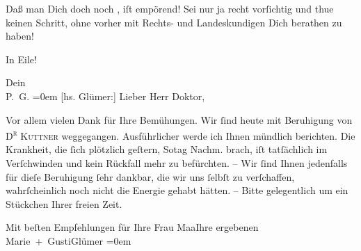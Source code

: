 \pstart
           Daß man Dich doch noch \label{K_L03056-4v}\label{K_L03056-4}, iſt {\pb}empörend! Sei nur ja recht vorſichtig und thue
               keinen Schritt, ohne vorher mit Rechts- und Landeskundigen Dich berathen zu
               haben!\pend
           
\pstart
           In Eile!\pend
           
\pstart
           Dein {\\[\baselineskip]}\spacefill\mbox{P. G.}\pend
           \leftskip=0em{}\vspace{1em}{\vspace{1\baselineskip}}
\pstart
           {\pb}{[}hs. Glümer:{]} Lieber Herr Doktor,\pend
           
\pstart
           Vor allem vielen Dank für Ihre Bemühungen. Wir{ }ſind heute mit Beruhigung
               von \textsc{D\textsuperscript{r}}{ }\textsc{Kuttner} weggegangen. Ausführlicher werde ich Ihnen mündlich berichten. Die Krankheit,
               die {\pb}ſich plötzlich geſtern, So{\geminationn}tag{ }Nachm. brach, iſt tatſächlich im Verſchwinden und kein Rückfall mehr zu befürchten. – Wir{ }ſind Ihnen
               jedenfalls für dieſe Beruhigung{ }ſehr dankbar, die wir uns{ }ſelbſt zu verſchaffen, {\pb}wahrſcheinlich noch nicht die Energie gehabt hätten.
               – Bitte gelegentlich um ein Stückchen Ihrer freien Zeit.\pend
           
\pstart
           Mit beſten Empfehlungen für Ihre Frau Ma{\geminationm}aIhre ergebenen {\\[\baselineskip]}\spacefill\mbox{Marie + GustiGlümer}\pend
           \leftskip=0em{}\endnumbering{}  \newcommand{\dateiname}{L03056}\newcommand{\titel}{Paul Goldmann an Arthur Schnitzler, 29. 1. [1901]}\newcommand{\editorInnen}{Martin Anton Müller und Laura Untner}

